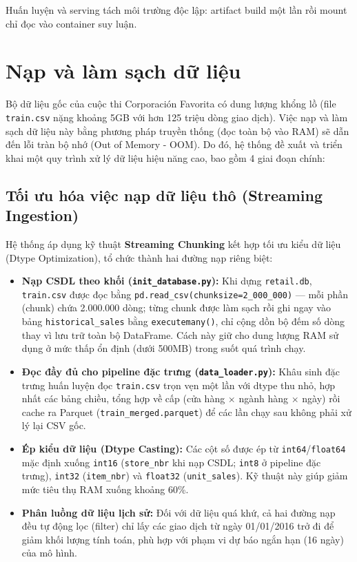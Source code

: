 \documentclass[12pt,a4paper]{report}
\begin{document}
Huấn luyện và serving tách môi trường độc lập: artifact build một lần rồi mount chỉ đọc vào container suy luận.

\section{Nạp và làm sạch dữ liệu}

Bộ dữ liệu gốc của cuộc thi Corporación Favorita có dung lượng khổng lồ (file \texttt{train.csv} nặng khoảng 5GB với hơn 125 triệu dòng giao dịch). Việc nạp và làm sạch dữ liệu này bằng phương pháp truyền thống (đọc toàn bộ vào RAM) sẽ dẫn đến lỗi tràn bộ nhớ (Out of Memory - OOM). Do đó, hệ thống đề xuất và triển khai một quy trình xử lý dữ liệu hiệu năng cao, bao gồm 4 giai đoạn chính:

\subsection{Tối ưu hóa việc nạp dữ liệu thô (Streaming Ingestion)}
Hệ thống áp dụng kỹ thuật \textbf{Streaming Chunking} kết hợp tối ưu kiểu dữ liệu (Dtype Optimization), tổ chức thành hai đường nạp riêng biệt:
\begin{itemize}
    \item \textbf{Nạp CSDL theo khối (\texttt{init\_database.py}):} Khi dựng \texttt{retail.db}, \texttt{train.csv} được đọc bằng \texttt{pd.read\_csv(chunksize=2\_000\_000)} --- mỗi phần (chunk) chứa 2.000.000 dòng; từng chunk được làm sạch rồi ghi ngay vào bảng \texttt{historical\_sales} bằng \texttt{executemany()}, chỉ cộng dồn bộ đếm số dòng thay vì lưu trữ toàn bộ DataFrame. Cách này giữ cho dung lượng RAM sử dụng ở mức thấp ổn định (dưới 500MB) trong suốt quá trình chạy.
    \item \textbf{Đọc đầy đủ cho pipeline đặc trưng (\texttt{data\_loader.py}):} Khâu sinh đặc trưng huấn luyện đọc \texttt{train.csv} trọn vẹn một lần với dtype thu nhỏ, hợp nhất các bảng chiều, tổng hợp về cấp (cửa hàng $\times$ ngành hàng $\times$ ngày) rồi cache ra Parquet (\texttt{train\_merged.parquet}) để các lần chạy sau không phải xử lý lại CSV gốc.
    \item \textbf{Ép kiểu dữ liệu (Dtype Casting):} Các cột số được ép từ \texttt{int64}/\texttt{float64} mặc định xuống \texttt{int16} (\texttt{store\_nbr} khi nạp CSDL; \texttt{int8} ở pipeline đặc trưng), \texttt{int32} (\texttt{item\_nbr}) và \texttt{float32} (\texttt{unit\_sales}). Kỹ thuật này giúp giảm mức tiêu thụ RAM xuống khoảng 60\%.
    \item \textbf{Phân luồng dữ liệu lịch sử:} Đối với dữ liệu quá khứ, cả hai đường nạp đều tự động lọc (filter) chỉ lấy các giao dịch từ ngày 01/01/2016 trở đi để giảm khối lượng tính toán, phù hợp với phạm vi dự báo ngắn hạn (16 ngày) của mô hình.
\end{itemize}
\end{document}
